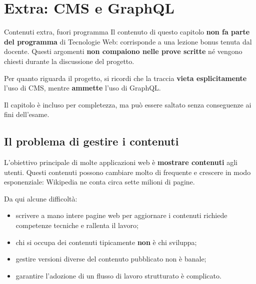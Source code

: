 \chapter{Extra: CMS e GraphQL}

\begin{errorbox}{{Contenuti extra, fuori programma}}
  Il contenuto di questo capitolo \textbf{non fa parte del programma} di
  Tecnologie Web: corrisponde a una lezione bonus tenuta dal docente. Questi
  argomenti \textbf{non compaiono nelle prove scritte} né vengono chiesti
  durante la discussione del progetto.

  Per quanto riguarda il progetto, si ricordi che la traccia
  \textbf{vieta esplicitamente} l'uso di CMS, mentre \textbf{ammette} l'uso di
  GraphQL.

  Il capitolo è incluso per completezza, ma può essere saltato senza
  conseguenze ai fini dell'esame.
\end{errorbox}

\section{Il problema di gestire i contenuti}

L'obiettivo principale di molte applicazioni web è \textbf{mostrare contenuti}
agli utenti. Questi contenuti possono cambiare molto di frequente e crescere in
modo esponenziale: Wikipedia ne conta circa sette milioni di pagine.

Da qui alcune difficoltà:

\begin{itemize}
  \item scrivere a mano intere pagine web per aggiornare i contenuti richiede
        competenze tecniche e rallenta il lavoro;
  \item chi si occupa dei contenuti tipicamente \textbf{non} è chi sviluppa;
  \item gestire versioni diverse del contenuto pubblicato non è banale;
  \item garantire l'adozione di un flusso di lavoro strutturato è complicato.
\end{itemize}


